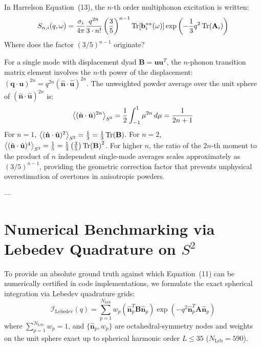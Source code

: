 \documentclass[11pt,a4paper]{article}
\theoremstyle{definition}
\begin{document}
In Harrelson Equation~(13), the $n$-th order multiphonon excitation is written:
\begin{equation}
S_{n,i}(q, \omega) = \frac{\sigma_i}{4\pi} \frac{q^{2n}}{3 \cdot n!} \left(\frac{3}{5}\right)^{n-1} \Tr[\mathbf{b}_i^{*n}(\omega)] \exp\left( -\frac{1}{3} q^2 \Tr(\mathbf{A}_i) \right)
\end{equation}
Where does the factor $(3/5)^{n-1}$ originate?

For a single mode with displacement dyad $\mathbf{B} = \mathbf{u}\mathbf{u}^T$, the $n$-phonon transition matrix element involves the $n$-th power of the displacement: $(\mathbf{q}\cdot\mathbf{u})^{2n} = q^{2n} (\hat{\mathbf{n}}\cdot\hat{\mathbf{u}})^{2n}$.
The unweighted powder average over the unit sphere of $(\hat{\mathbf{n}}\cdot\hat{\mathbf{u}})^{2n}$ is:
\begin{equation}
\ev{(\hat{\mathbf{n}}\cdot\hat{\mathbf{u}})^{2n}}_{S^2} = \frac{1}{2} \int_{-1}^1 \mu^{2n} \, d\mu = \frac{1}{2n+1}
\end{equation}
For $n=1$, $\ev{(\hat{\mathbf{n}}\cdot\hat{\mathbf{u}})^2}_{S^2} = \frac{1}{3} = \frac{1}{3} \Tr(\mathbf{B})$.
For $n=2$, $\ev{(\hat{\mathbf{n}}\cdot\hat{\mathbf{u}})^4}_{S^2} = \frac{1}{5} = \frac{1}{3} \left(\frac{3}{5}\right) \Tr(\mathbf{B})^2$.
For higher $n$, the ratio of the $2n$-th moment to the product of $n$ independent single-mode averages scales approximately as $(3/5)^{n-1}$, providing the geometric correction factor that prevents unphysical overestimation of overtones in anisotropic powders.

---

\section{Numerical Benchmarking via Lebedev Quadrature on \texorpdfstring{$S^2$}{S2}}
\label{sec:lebedev}

To provide an absolute ground truth against which Equation~(11) can be numerically certified in code implementations, we formulate the exact spherical integration via Lebedev quadrature grids:
\begin{equation}
\mathcal{I}_{\text{Lebedev}}(q) = \sum_{p=1}^{N_{\text{Leb}}} w_p \left( \hat{\mathbf{n}}_p^T \mathbf{B} \hat{\mathbf{n}}_p \right) \exp\left( -q^2 \hat{\mathbf{n}}_p^T \mathbf{A} \hat{\mathbf{n}}_p \right)
\end{equation}
where $\sum_{p=1}^{N_{\text{Leb}}} w_p = 1$, and $\{\hat{\mathbf{n}}_p, w_p\}$ are octahedral-symmetry nodes and weights on the unit sphere exact up to spherical harmonic order $L \le 35$ ($N_{\text{Leb}} = 590$).
\end{document}
